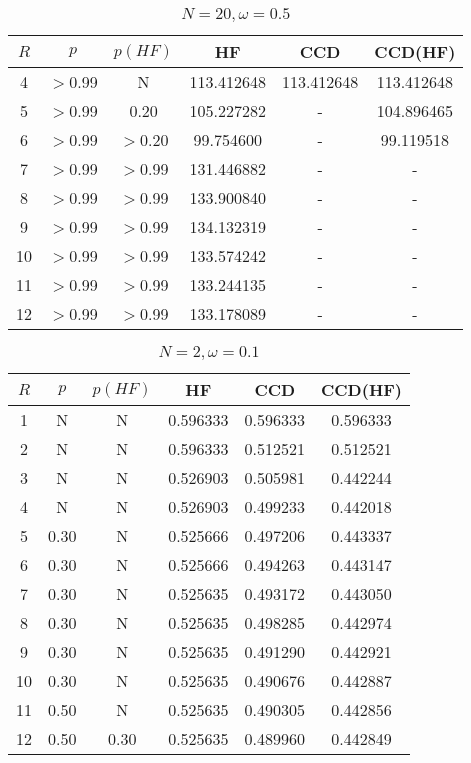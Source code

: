     \begin{table}[H]
    \centering
    \caption{$N = 20, \omega = 0.5$}
    \begin{tabular}{cccccc}
    \toprule
    $R$ & $p$ & $p(HF)$ & HF & CCD & CCD(HF) \\
    \midrule
    4 & $>$0.99 & N & 113.412648 & 113.412648 & 113.412648 \\
    5 & $>$0.99 & 0.20 & 105.227282 & - & 104.896465 \\
    6 & $>$0.99 & $>$0.20 & 99.754600 & - & 99.119518 \\
    7 & $>$0.99 & $>$0.99 & 131.446882 & - & - \\
    8 & $>$0.99 & $>$0.99 & 133.900840 & - & - \\
    9 & $>$0.99 & $>$0.99 & 134.132319 & - & - \\
    10 & $>$0.99 & $>$0.99 & 133.574242 & - & - \\
    11 & $>$0.99 & $>$0.99 & 133.244135 & - & - \\
    12 & $>$0.99 & $>$0.99 & 133.178089 & - & - \\
    \bottomrule
    \end{tabular}
\end{table}
    

\begin{table}[H]
    \centering
    \caption{$N = 2, \omega = 0.1$}
    \begin{tabular}{cccccc}
    \toprule
    $R$ & $p$ & $p(HF)$ & HF & CCD & CCD(HF) \\
    \midrule
    1 & N & N & 0.596333 & 0.596333 & 0.596333 \\
    2 & N & N & 0.596333 & 0.512521 & 0.512521 \\
    3 & N & N & 0.526903 & 0.505981 & 0.442244 \\
    4 & N & N & 0.526903 & 0.499233 & 0.442018 \\
    5 & 0.30 & N & 0.525666 & 0.497206 & 0.443337 \\
    6 & 0.30 & N & 0.525666 & 0.494263 & 0.443147 \\
    7 & 0.30 & N & 0.525635 & 0.493172 & 0.443050 \\
    8 & 0.30 & N & 0.525635 & 0.498285 & 0.442974 \\
    9 & 0.30 & N & 0.525635 & 0.491290 & 0.442921 \\
    10 & 0.30 & N & 0.525635 & 0.490676 & 0.442887 \\
    11 & 0.50 & N & 0.525635 & 0.490305 & 0.442856 \\
    12 & 0.50 & 0.30 & 0.525635 & 0.489960 & 0.442849 \\
    \bottomrule
    \end{tabular}
\end{table}

